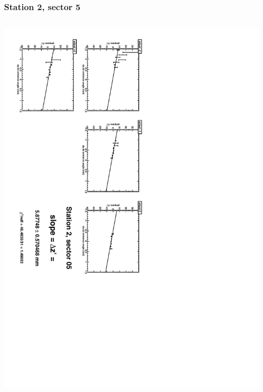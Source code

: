 \documentclass[compress]{beamer}
\begin{document}
\begin{frame}
\frametitle{Station 2, sector 5}
\begin{columns}
\includegraphics[height=\linewidth, angle=90]{zfits/zfit_2_05.pdf}


\end{columns}
\end{frame}
\end{document}
